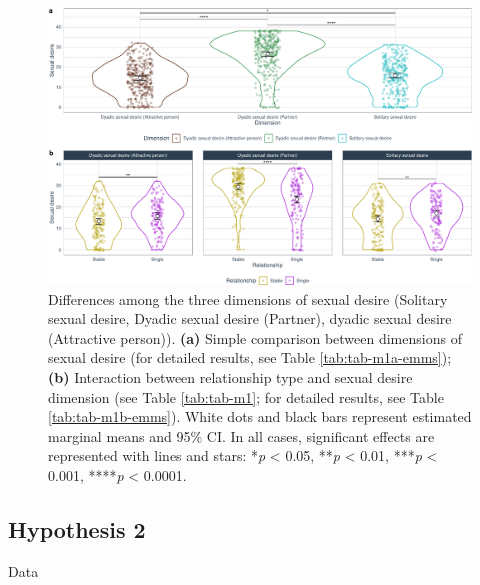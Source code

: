 \documentclass[
  bookmarksnumbered]{article}
\begin{document}
\begin{figure}
\centering
\includegraphics{Deseo_excitacion_sexual_files/figure-latex/fig-h1-1.pdf}
\caption{\label{fig:fig-h1}Differences among the three dimensions of sexual desire (Solitary sexual desire, Dyadic sexual desire (Partner), dyadic sexual desire (Attractive person)). \textbf{(a)} Simple comparison between dimensions of sexual desire (for detailed results, see Table \ref{tab:tab-m1a-emms}); \textbf{(b)} Interaction between relationship type and sexual desire dimension (see Table \ref{tab:tab-m1}; for detailed results, see Table \ref{tab:tab-m1b-emms}). White dots and black bars represent estimated marginal means and 95\% CI. In all cases, significant effects are represented with lines and stars: *\emph{p} \textless{} 0.05, **\emph{p} \textless{} 0.01, ***\emph{p} \textless{} 0.001, ****\emph{p} \textless{} 0.0001.}
\end{figure}

\hypertarget{hypothesis2}{%
\subsection{Hypothesis 2}\label{hypothesis2}}

Data
\end{document}
